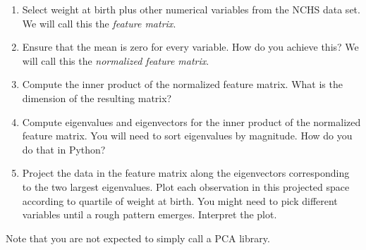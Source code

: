 \begin{enumerate}
	\item Select weight at birth plus other numerical variables from the NCHS data set. We will call this the \textit{feature matrix}. 
	\item Ensure that the mean is zero for every variable. How do you achieve this? \QA  We will call this the \textit{normalized feature matrix}.  
	\item Compute the inner product of the normalized feature matrix. What is the dimension of the resulting matrix? \QA
	\item Compute eigenvalues and eigenvectors for the inner product of the normalized feature matrix. You will need to sort eigenvalues by magnitude. How do you do that in Python? \QA
	\item Project the data in the feature matrix along the eigenvectors corresponding to the two largest eigenvalues. Plot each observation in this projected space according to quartile of weight at birth. You might need to pick different variables until a rough pattern emerges. Interpret the plot. \QA  
\end{enumerate}

Note that you are not expected to simply call a PCA library. 

%
%	

